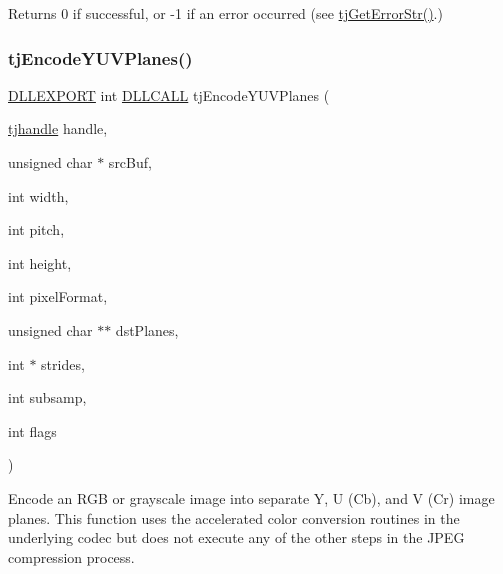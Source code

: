 \begin{DoxyReturn}{Returns}
0 if successful, or -\/1 if an error occurred (see \hyperlink{group___turbo_j_p_e_g_ga9af79c908ec131b1ae8d52fe40375abf}{tj\+Get\+Error\+Str()}.) 
\end{DoxyReturn}
\mbox{\label{group___turbo_j_p_e_g_gaa791db8598853ddcad24e42897ef1269}} 
\subsubsection{\texorpdfstring{tj\+Encode\+Y\+U\+V\+Planes()}{tjEncodeYUVPlanes()}}
{\footnotesize\ttfamily \hyperlink{turbojpeg_8h_a808e08638be3cba36e36759e5b150de0}{D\+L\+L\+E\+X\+P\+O\+RT} int \hyperlink{turbojpeg_8h_a54b25836118bfac94a53a7b790f3ccb2}{D\+L\+L\+C\+A\+LL} tj\+Encode\+Y\+U\+V\+Planes (\begin{DoxyParamCaption}\item[{\hyperlink{group___turbo_j_p_e_g_ga758d2634ecb4949de7815cba621f5763}{tjhandle}}]{handle,  }\item[{unsigned char $\ast$}]{src\+Buf,  }\item[{int}]{width,  }\item[{int}]{pitch,  }\item[{int}]{height,  }\item[{int}]{pixel\+Format,  }\item[{unsigned char $\ast$$\ast$}]{dst\+Planes,  }\item[{int $\ast$}]{strides,  }\item[{int}]{subsamp,  }\item[{int}]{flags }\end{DoxyParamCaption})}

Encode an R\+GB or grayscale image into separate Y, U (Cb), and V (Cr) image planes. This function uses the accelerated color conversion routines in the underlying codec but does not execute any of the other steps in the J\+P\+EG compression process.


